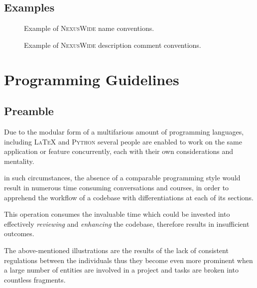 \documentclass[13pt]{scrarticle}
\newcommand{\header}[1]{ \textsf{#1} \relax{}}
\newcommand{\important}[1]{\textit{#1}}
\newcommand{\name}[1]{{\textsc{#1}}}
\begin{document}
    \newpage
    \subsection{Examples}

        \begin{figure}[h!]
            \caption{Example of \name{NexusWide} name conventions.}
        \end{figure}

        \begin{figure}[h!]
            \caption{Example of \name{NexusWide} description comment conventions.}
        \end{figure}


    \section{\header{Programming Guidelines}}
    \subsection{Preamble}


    Due to the modular form of a multifarious amount of programming languages,
    including \name{\LaTeX} and \name{Python}\footnotemark{}
    several people are enabled to work on the same application or feature concurrently,
    each with their own considerations and mentality. \newline

    in such circumstances, the absence of a comparable programming style would result in numerous time consuming conversations and courses,
    in order to apprehend the workflow of a codebase with differentiations at each of its sections. \newline

    This operation consumes the invaluable time which could be invested into effectively \important{reviewing} and \important{enhancing} the codebase,
    therefore results in insufficient outcomes. \newline

    The above-mentioned illustrations are the results of the lack of consistent regulations between the individuals
    thus they become even more prominent when a large number of entities are involved in a project
    and tasks are broken into countless fragments.
    \newline
\end{document}
